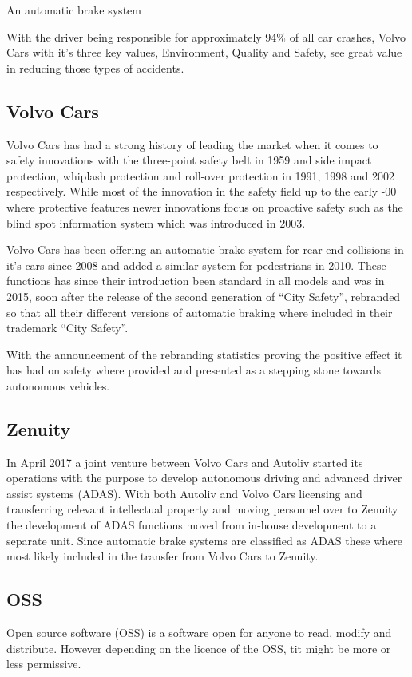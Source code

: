 \documentclass[conference]{IEEEtran}
\begin{document}
An automatic brake system

With the driver being responsible for approximately 94\% of all car crashes, Volvo Cars with it's three key values, Environment, Quality and Safety, see great value in reducing those types of accidents.\cite{CrashStats,VolvoValues}

\subsection{Volvo Cars}
Volvo Cars has had a strong history of leading the market when it comes to safety innovations with the three-point safety belt in 1959 and side impact protection, whiplash protection and roll-over protection in 1991, 1998 and 2002 respectively. 
While most of the innovation in the safety field up to the early -00 where protective features newer innovations focus on proactive safety such as the blind spot information system which was introduced in 2003.\cite{VolvoInnovation}

Volvo Cars has been offering an automatic brake system for rear-end collisions in it's cars since 2008 and added a similar system for pedestrians in 2010. \cite{VolvoInnovation}
These functions has since their introduction been standard in all models and was in 2015, soon after the release of the second generation of ``City Safety'', rebranded so that all their different versions of automatic braking where included in their trademark ``City Safety''.\cite{CitySafety}

With the announcement of the rebranding statistics proving the positive effect it has had on safety where provided and presented as a stepping stone towards autonomous vehicles.\cite{CitySafety}
\subsection{Zenuity}
In April 2017 a joint venture between Volvo Cars and Autoliv started its operations with the purpose to develop autonomous driving and advanced driver assist systems (ADAS).\cite{ZenuityLaunch} With both Autoliv and Volvo Cars licensing and transferring relevant intellectual property and moving personnel over to Zenuity the development of ADAS functions moved from in-house development to a separate unit. Since automatic brake systems are classified as ADAS these where most likely included in the transfer from Volvo Cars to Zenuity. 
\subsection{OSS}
Open source software (OSS) is a software open for anyone to read, modify and distribute. However depending on the licence of the OSS, tit might be more or less permissive. \cite{OSS}
\end{document}
